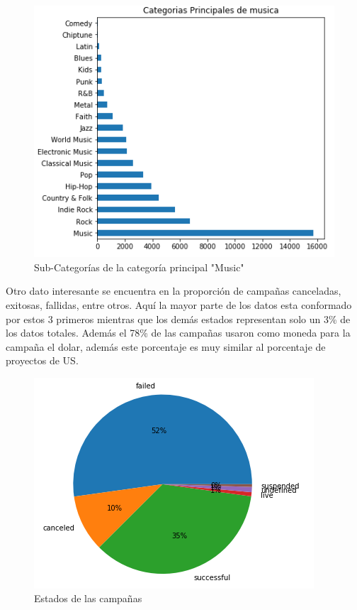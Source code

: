 \documentclass[journal]{IEEEtran}
\begin{document}
\begin{figure}[H]
    \centering
    \captionsetup{justification=centering}
\includegraphics[width=\linewidth]{Images/CategoriasMusic.PNG}
    \caption{Sub-Categorías de la categoría principal "Music"}
\end{figure}

Otro dato interesante se encuentra en la proporción de campañas canceladas, exitosas, fallidas, entre otros. Aquí la mayor parte de los datos esta conformado por estos 3 primeros mientras que los demás estados representan solo un 3\% de los datos totales. Además el 78\% de las campañas usaron como moneda para la campaña el dolar, además este porcentaje es muy similar al porcentaje de proyectos de US.

\begin{figure}[H]
    \centering
    \captionsetup{justification=centering}
\includegraphics[width=\linewidth]{Images/states.png}
    \caption{Estados de las campañas}
\end{figure}
\end{document}
